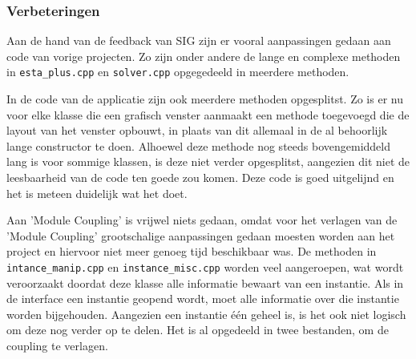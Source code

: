 \newpage

\subsubsection{Verbeteringen}
Aan de hand van de feedback van SIG zijn er vooral aanpassingen gedaan aan code van vorige projecten. Zo zijn onder andere de lange en complexe methoden in \texttt{esta\_plus.cpp} en \texttt{solver.cpp} opgegedeeld in meerdere methoden. 

In de code van de applicatie zijn ook meerdere methoden opgesplitst. Zo is er nu voor elke klasse die een grafisch venster aanmaakt een methode toegevoegd die de layout van het venster opbouwt, in plaats van dit allemaal in de al behoorlijk lange constructor te doen. Alhoewel deze methode nog steeds bovengemiddeld lang is voor sommige klassen, is deze niet verder opgesplitst, aangezien dit niet de leesbaarheid van de code ten goede zou komen. Deze code is goed uitgelijnd en het is meteen duidelijk wat het doet.

Aan 'Module Coupling' is vrijwel niets gedaan, omdat voor het verlagen van de 'Module Coupling' grootschalige aanpassingen gedaan moesten worden aan het project en hiervoor niet meer genoeg tijd beschikbaar was. De methoden in \texttt{intance\_manip.cpp} en \texttt{instance\_misc.cpp} worden veel aangeroepen, wat wordt veroorzaakt doordat deze klasse alle informatie bewaart van een instantie. Als in de interface een instantie geopend wordt, moet alle informatie over die instantie worden bijgehouden. Aangezien een instantie \'e\'en geheel is, is het ook niet logisch om deze nog verder op te delen. Het is al opgedeeld in twee bestanden, om de coupling te verlagen.
